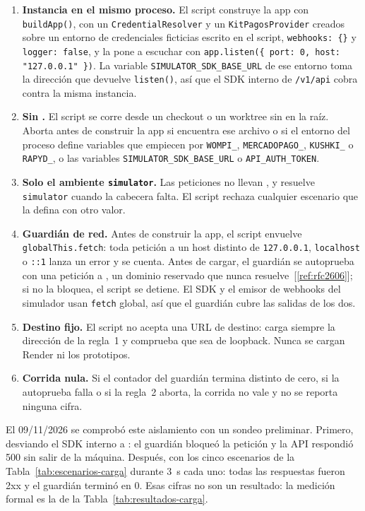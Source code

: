 \begin{enumerate}
  \item \textbf{Instancia en el mismo proceso.} El script construye la app con \texttt{buildApp()}, con un \texttt{CredentialResolver} y un \texttt{KitPagosProvider} creados sobre un entorno de credenciales ficticias escrito en el script, \texttt{webhooks: \{\}} y \texttt{logger: false}, y la pone a escuchar con \texttt{app.listen(\{ port: 0, host: "127.0.0.1" \})}. La variable \texttt{SIMULATOR\_SDK\_BASE\_URL} de ese entorno toma la dirección que devuelve \texttt{listen()}, así que el SDK interno de \texttt{/v1/api} cobra contra la misma instancia.
  \item \textbf{Sin .} El script se corre desde un checkout o un worktree sin  en la raíz. Aborta antes de construir la app si encuentra ese archivo o si el entorno del proceso define variables que empiecen por \texttt{WOMPI\_}, \texttt{MERCADOPAGO\_}, \texttt{KUSHKI\_} o \texttt{RAPYD\_}, o las variables \texttt{SIMULATOR\_SDK\_BASE\_URL} o \texttt{API\_AUTH\_TOKEN}.
  \item \textbf{Solo el ambiente \texttt{simulator}.} Las peticiones no llevan , y  resuelve \texttt{simulator} cuando la cabecera falta. El script rechaza cualquier escenario que la defina con otro valor.
  \item \textbf{Guardián de red.} Antes de construir la app, el script envuelve \texttt{globalThis.fetch}: toda petición a un host distinto de \texttt{127.0.0.1}, \texttt{localhost} o \texttt{::1} lanza un error y se cuenta. Antes de cargar, el guardián se autoprueba con una petición a , un dominio reservado que nunca resuelve~[\ref{ref:rfc2606}]; si no la bloquea, el script se detiene. El SDK y el emisor de webhooks del simulador usan \texttt{fetch} global, así que el guardián cubre las salidas de los dos.
  \item \textbf{Destino fijo.} El script no acepta una URL de destino: carga siempre la dirección de la regla~1 y comprueba que sea de loopback. Nunca se cargan Render ni los prototipos.
  \item \textbf{Corrida nula.} Si el contador del guardián termina distinto de cero, si la autoprueba falla o si la regla~2 aborta, la corrida no vale y no se reporta ninguna cifra.
\end{enumerate}

El 09/11/2026 se comprobó este aislamiento con un sondeo preliminar. Primero, desviando el SDK interno a : el guardián bloqueó la petición y la API respondió 500 sin salir de la máquina. Después, con los cinco escenarios de la Tabla~\ref{tab:escenarios-carga} durante 3~s cada uno: todas las respuestas fueron 2xx y el guardián terminó en 0. Esas cifras no son un resultado: la medición formal es la de la Tabla~\ref{tab:resultados-carga}.


